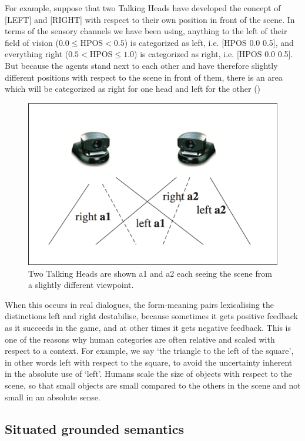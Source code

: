 For example, suppose that two Talking Heads have developed the 
concept of [LEFT] and [RIGHT] with respect to their own position 
in front of the scene. In terms of the sensory 
channels we have been using, anything to the left of their field  
of vision ($0.0 \le $HPOS$ < 0.5$) is categorized as
left, i.e. [HPOS 0.0 0.5], and everything right  
($0.5 < $HPOS$ \le 1.0$) is categorized as right, 
i.e. [HPOS 0.0 0.5]. But because the
agents stand next to each other and have therefore 
slightly different positions with respect to the 
scene in front of them, there is an area which will 
be categorized as right for one head and left for the other ()

\begin{figure}[htbp]
  \centerline{\includegraphics[width=.65\textwidth]{chap2/figs/left-right}}
\caption{\label{2:left-right} Two Talking Heads are shown {\bfshape a1} and 
{\bfshape a2} each seeing the scene from a slightly different viewpoint.}
\end{figure}
When this occurs in real dialogues, the form-meaning 
pairs lexicalising the distinctions left and right destabilise,
because sometimes it gets positive feedback as 
it succeeds in the game, and at other times it 
gets negative feedback. 
This is one of the reasons why human categories are often 
relative and scaled with respect to a context.
For example, we say `the triangle to the left of the square', in 
other words left with respect to the square, to avoid the uncertainty
inherent in the absolute use of `left'. Humans scale the size 
of objects with respect to the scene, so that small 
objects are small compared to the others in the scene 
and not small in an absolute sense. 

\subsection{Situated grounded semantics}

